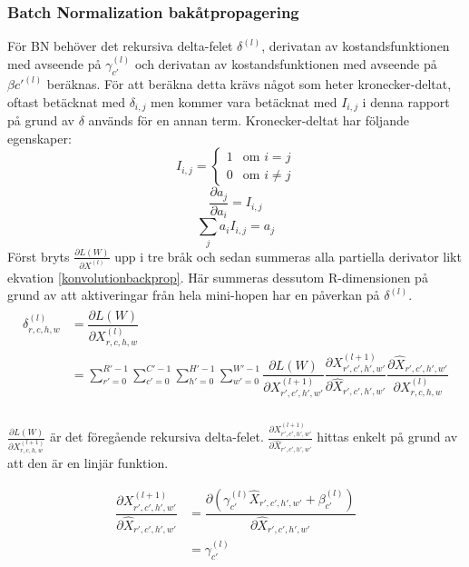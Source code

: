 \documentclass[a4paper,11pt,twoside]{article}
\newcommand*{\pd}[2]{\ensuremath{\dfrac{\partial #1}{\partial #2}}}
\newcommand*{\inpd}[2]{\ensuremath{\frac{\partial #1}{\partial #2}}}
\begin{document}
\subsubsection{Batch Normalization bakåtpropagering}
För BN behöver det rekursiva delta-felet $\delta^{(l)}$, derivatan av kostandsfunktionen med avseende på $\gamma_{c'}^{(l)}$ och derivatan av kostandsfunktionen med avseende på $\beta{c'}^{(l)}$ beräknas. För att beräkna detta krävs något som heter kronecker-deltat, oftast betäcknat med $\delta_{i,j}$ men kommer vara betäcknat med $I_{i,j}$ i denna rapport på grund av $\delta$ används för en annan term. Kronecker-deltat har följande egenskaper: \cite{webBN1} \cite{webBN2}
\begin{equation}\label{kroneckerdelta}
I_{i,j} = \begin{cases} 1 & \mbox{om } i = j \\ 0 & \mbox{om } i \neq j  \end{cases}
\end{equation}
\begin{equation}\label{kroneckerdeltaDERIVATIVE}
\pd{a_{j}}{a_i} = I_{i,j}
\end{equation}
\begin{equation}\label{kroneckerdeltaSUM}
\sum_j  a_i  I_{i,j} = a_j
\end{equation}
Först bryts $\inpd{L(W)}{X^{(l)}}$ upp i tre bråk och sedan summeras alla partiella derivator likt ekvation \eqref{konvolutionbackprop}. \cite{webBN1} \cite{webBN2} Här summeras dessutom R-dimensionen på grund av att aktiveringar från hela mini-hopen har en påverkan på $\delta^{(l)}$.
\begin{align}\label{BN_delta_error}
\begin{split}
	\delta^{(l)}_{r,c,h,w}
		& = \pd{L(W)}{X^{(l)}_{r,c,h,w}} \\
		& = \sum^{R'-1}_{r'=0} \sum^{C'-1}_{c'=0} \sum^{H'-1}_{h'=0} \sum^{W'-1}_{w'=0} \pd{L(W)}{X^{(l+1)}_{r',c',h',w'}} \pd{X^{(l+1)}_{r',c',h',w'}}{\hat{X}_{r',c',h',w'}} \pd{\hat{X}_{r',c',h',w'}}{{X}^{(l)}_{r,c,h,w}}\\
\end{split}
\end{align}

$\inpd{L(W)}{X^{(l+1)}_{r,c,h,w}}$ är det föregående rekursiva delta-felet. $\inpd{X^{(l+1)}_{r',c',h',w'}}{\hat{X}_{r',c',h',w'}}$ hittas enkelt på grund av att den är en linjär funktion. \cite{webBN1} \cite{webBN2}

\begin{equation}\label{BN_dxdxhat}
\begin{split}
	\pd{X^{(l+1)}_{r',c',h',w'}}{\hat{X}_{r',c',h',w'}}
		& = \pd{(\gamma_{c'}^{(l)} \hat{X}_{r',c',h',w'} + \beta_{c'}^{(l)})}{\hat{X}_{r',c',h',w'}} \\
		& =\gamma_{c'}^{(l)}
\end{split}
\end{equation}
\end{document}
